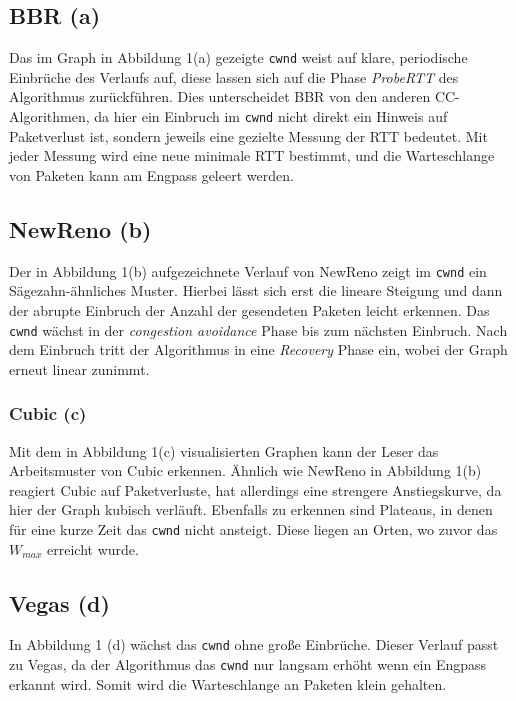 \documentclass[paper=a4,fontsize=12pt,ngerman]{scrartcl}
\begin{document}
\subsection*{BBR (a)}

Das im Graph in Abbildung 1(a) gezeigte \texttt{cwnd} weist auf klare, periodische Einbrüche des Verlaufs auf, diese lassen
sich auf die Phase \textit{ProbeRTT} des Algorithmus zurückführen. Dies unterscheidet BBR von den anderen
CC-Algorithmen, da hier ein Einbruch im \texttt{cwnd} nicht direkt ein Hinweis auf Paketverlust ist, sondern jeweils eine 
gezielte Messung der RTT bedeutet. Mit jeder Messung wird eine neue minimale RTT bestimmt, und die Warteschlange von Paketen
kann am Engpass geleert werden.

\subsection*{NewReno (b)}

Der in Abbildung 1(b) aufgezeichnete Verlauf von NewReno zeigt im \texttt{cwnd} ein Sägezahn-ähnliches Muster. Hierbei lässt sich erst
die lineare Steigung und dann der abrupte Einbruch der Anzahl der gesendeten Paketen leicht erkennen.
Das \texttt{cwnd} wächst in der \textit{congestion avoidance} Phase bis zum nächsten Einbruch.
Nach dem Einbruch tritt der Algorithmus in eine \textit{Recovery} Phase ein, wobei der Graph erneut linear zunimmt.

\subsubsection*{Cubic (c)}

Mit dem in Abbildung 1(c) visualisierten Graphen kann der Leser das Arbeitsmuster von Cubic erkennen.
Ähnlich wie NewReno in Abbildung 1(b) reagiert Cubic auf Paketverluste, hat allerdings eine strengere Anstiegskurve,
da hier der Graph kubisch verläuft. Ebenfalls zu erkennen sind Plateaus, in denen für eine kurze Zeit das 
\texttt{cwnd} nicht ansteigt. Diese liegen an Orten, wo zuvor das $W_{max}$ erreicht wurde.

\subsection*{Vegas (d)}

In Abbildung 1 (d) wächst das \texttt{cwnd} ohne große Einbrüche. Dieser Verlauf passt zu Vegas, da der Algorithmus 
das \texttt{cwnd} nur langsam erhöht wenn ein Engpass erkannt wird. Somit wird die Warteschlange an Paketen klein gehalten.
\end{document}
